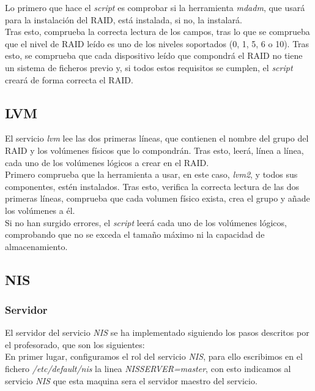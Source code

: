 \documentclass[12pt,a4paper, spanish]{article}
\begin{document}
Lo primero que hace el \textit{script} es comprobar si la herramienta \textit{mdadm}, que usará para la instalación del RAID, está instalada, si no, la instalará.\\

Tras esto, comprueba la correcta lectura de los campos, tras lo que se comprueba que el nivel de RAID leído es uno de los niveles soportados (0, 1, 5, 6 o 10). Tras esto, se comprueba que cada dispositivo leído que compondrá el RAID no tiene un sistema de ficheros previo y, si todos estos requisitos se cumplen, el \textit{script} creará de forma correcta el RAID.\\


\newpage
\subsection{LVM}
\noindent El servicio \textit{lvm} lee las dos primeras líneas, que contienen el nombre del grupo del RAID y los volúmenes físicos que lo compondrán. Tras esto, leerá, línea a línea, cada uno de los volúmenes lógicos a crear en el RAID.\\

Primero comprueba que la herramienta a usar, en este caso, \textit{lvm2}, y todos sus componentes, estén instalados. Tras esto, verifica la correcta lectura de las dos primeras líneas, comprueba que cada volumen físico exista, crea el grupo y añade los volúmenes a él.\\

Si no han surgido errores, el \textit{script} leerá cada uno de los volúmenes lógicos, comprobando que no se exceda el tamaño máximo ni la capacidad de almacenamiento.


\subsection{NIS}
\subsubsection{Servidor}
\noindent El servidor del servicio \textit{NIS} se ha implementado siguiendo los pasos descritos por el profesorado, que son los siguientes:\\ 

En primer lugar, configuramos el rol del servicio \textit{NIS}, para ello escribimos en el fichero \textit{/etc/default/nis} la linea \textit{NISSERVER=master}, con esto indicamos al servicio \textit{NIS} que esta maquina sera el servidor maestro del servicio.\\
\end{document}
